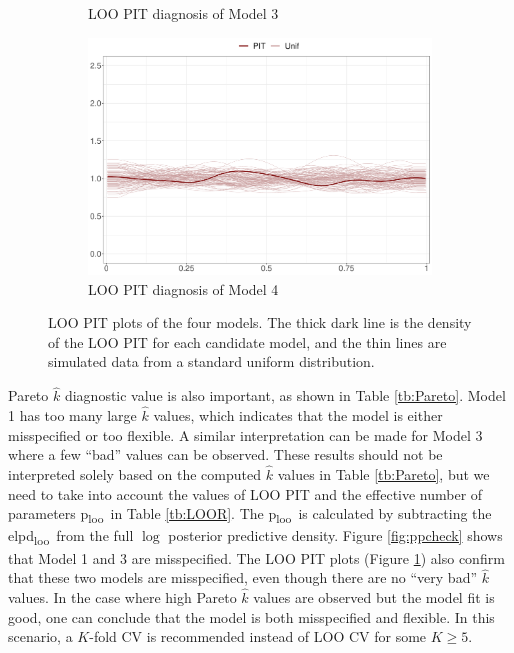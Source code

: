 \documentclass[a4paper]{article}   	%
\newcommand{\elpd}{elpd\textsubscript{loo}}
\newcommand{\ploo}{p\textsubscript{loo}}
\begin{document}
\begin{figure}[!htp]
\begin{subfigure}[t]{0.45\textwidth}
			\caption{LOO PIT diagnosis of Model 3}
		\end{subfigure}
		\begin{subfigure}[t]{0.45\textwidth}
			\includegraphics[width=\linewidth]{Images/pit_STRand_scale.pdf}
			\caption{LOO PIT diagnosis of Model 4}
		\end{subfigure}
		\caption{LOO PIT plots of the four models. The thick dark line is the density of the LOO PIT for each candidate model, and the thin lines are simulated data from a standard uniform distribution. }\label{fig:pitloo}
	\end{figure}
	
	
	Pareto $\hat{k}$ diagnostic value is also important, as shown in Table \ref{tb:Pareto}. Model 1 has too many large $\hat{k}$ values, which indicates that the model is either misspecified or too flexible. A similar interpretation can be made for Model 3 where a few ``bad'' values can be observed. These results should not be interpreted solely based on the computed $\hat{k}$ values in Table \ref{tb:Pareto}, but we need to take into account the values of LOO PIT and the effective number of parameters \ploo\ in Table \ref{tb:LOOR}. The \ploo\ is calculated by subtracting the \elpd\ from the full $\log$ posterior predictive density. Figure \ref{fig:ppcheck} shows that Model 1 and 3 are misspecified. The LOO PIT plots (Figure \ref{fig:pitloo}) also confirm that these two models are misspecified, even though there are no ``very bad'' $\hat{k}$ values. In the case where high Pareto $\hat{k}$ values are observed but the model fit is good, one can conclude that the model is both misspecified and flexible. In this scenario, a $K$-fold CV is recommended instead of LOO CV for some $K \geq 5$. 
	
\end{document}
